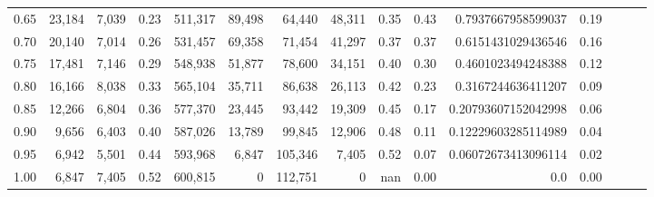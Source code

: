\begin{tabular}{rrrrrrrrrrrrrrr}
0.65 &  23,184 &  7,039 &  0.23 &  511,317 &   89,498 &   64,440 &   48,311 &  0.35 &  0.43 &   0.7937667958599037 &      0.19 \\
0.70 &  20,140 &  7,014 &  0.26 &  531,457 &   69,358 &   71,454 &   41,297 &  0.37 &  0.37 &   0.6151431029436546 &      0.16 \\
0.75 &  17,481 &  7,146 &  0.29 &  548,938 &   51,877 &   78,600 &   34,151 &  0.40 &  0.30 &   0.4601023494248388 &      0.12 \\
0.80 &  16,166 &  8,038 &  0.33 &  565,104 &   35,711 &   86,638 &   26,113 &  0.42 &  0.23 &   0.3167244636411207 &      0.09 \\
0.85 &  12,266 &  6,804 &  0.36 &  577,370 &   23,445 &   93,442 &   19,309 &  0.45 &  0.17 &  0.20793607152042998 &      0.06 \\
0.90 &   9,656 &  6,403 &  0.40 &  587,026 &   13,789 &   99,845 &   12,906 &  0.48 &  0.11 &  0.12229603285114989 &      0.04 \\
0.95 &   6,942 &  5,501 &  0.44 &  593,968 &    6,847 &  105,346 &    7,405 &  0.52 &  0.07 &  0.06072673413096114 &      0.02 \\
1.00 &   6,847 &  7,405 &  0.52 &  600,815 &        0 &  112,751 &        0 &   nan &  0.00 &                  0.0 &      0.00 \\
\bottomrule
\end{tabular}
